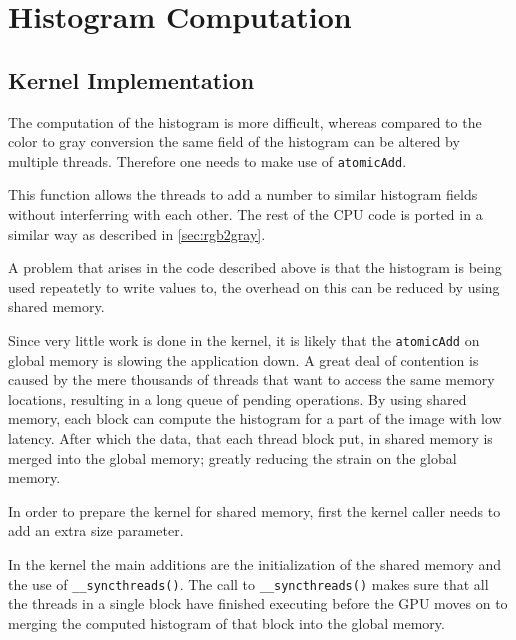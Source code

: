 \documentclass[final]{report}
\begin{document}
\chapter{Histogram Computation}

\section{Kernel Implementation}
The computation of the histogram is more difficult, whereas compared to the color to gray conversion the same field of the histogram can be altered by multiple threads.
Therefore one needs to make use of \texttt{atomicAdd\(\)}.


This function allows the threads to add a number to similar histogram fields without interferring with each other.
The rest of the CPU code is ported in a similar way as described in \cref{sec:rgb2gray}.

A problem that arises in the code described above is that the histogram is being used repeatetly to write values to, the overhead on this can be reduced by using shared memory.

Since very little work is done in the kernel, it is likely that the \texttt{atomicAdd\(\)} on global memory is slowing the application down.
A great deal of contention is caused by the mere thousands of threads that want to access the same memory locations, resulting in a long queue of pending operations.
By using shared memory, each block can compute the histogram for a part of the image with low latency.
After which the data, that each thread block put, in shared memory is merged into the global memory; greatly reducing the strain on the global memory.

In order to prepare the kernel for shared memory, first the kernel caller needs to add an extra size parameter.


In the kernel the main additions are the initialization of the shared memory and the use of \texttt{\_\_syncthreads()}.
The call to \texttt{\_\_syncthreads()} makes sure that all the threads in a single block have finished executing before the GPU moves on to merging the computed histogram of that block into the global memory.
\end{document}
